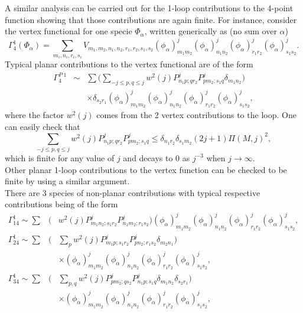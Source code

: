 \documentclass[a4paper,11pt,twoside]{article}
\numberwithin{equation}{section}
\theoremstyle{nonumberplain}
\newcounter{and}
\begin{document}
A similar analysis can be carried out for the 1-loop contributions to the 4-point function showing that those contributions are again finite. For instance, consider the vertex functional for one specie $\Phi_\alpha$, written generically as (no sum over $\alpha$)
\begin{equation}
\Gamma^1_4(\Phi_\alpha)=\sum_{m_i,n_i,r_i,s_i} V_{m_1,m_2,n_1,n_2,r_1,r_2,s_1,s_2}(\phi_\alpha)^j_{m_1m_2}(\phi_\alpha)^j_{n_1n_2}(\phi_\alpha)^j_{r_1r_2}(\phi_\alpha)^j_{s_1s_2}\label{vertex-functional}.
\end{equation}
Typical planar contributions to the vertex functional are of the form
\begin{eqnarray}
\Gamma^{P\ 1}_4&\sim&\sum\big(\sum_{-j\le p,q\le j}w^2(j)P^j_{n_1p;qr_2}P^j_{pm_2;s_1q}\delta_{m_1n_2}\big)\nonumber\\
&&\times\delta_{s_2r_1} (\phi_\alpha)^j_{m_1m_2}(\phi_\alpha)^j_{n_1n_2}(\phi_\alpha)^j_{r_1r_2}(\phi_\alpha)^j_{s_1s_2}\label{planar-4pt},
\end{eqnarray}
where the factor $w^2(j)$ comes from the 2 vertex contributions to the loop. One can easily check that
\begin{equation}
\sum_{-j\le p,q\le j}w^2(j)P^j_{n_1p;qr_2}P^j_{pm_2;s_1q}\le\delta_{n_1r_2}
\delta_{s_1m_2}(2j+1)\Pi(M,j)^2\label{bound-planar-4pt},
\end{equation}
which is finite for any value of $j$ and decays to $0$ as $j^{-3}$ when $j\to\infty$. \\
Other planar 1-loop contributions to the vertex function can be checked to be finite by using a similar argument.\\
There are 3 species of non-planar contributions with typical respective contributions being of the form
\begin{eqnarray}
\Gamma^1_{14}\sim\sum &\big(&w^2(j)P^j_{m_1n_2;s_1r_2}P^j_{n_1m_2;r_1s_2}\big)(\phi_\alpha)^j_{m_1m_2}(\phi_\alpha)^j_{n_1n_2}(\phi_\alpha)^j_{r_1r_2}(\phi_\alpha)^j_{s_1s_2}\label{gamma14},\\
\Gamma^1_{24}\sim\sum&\big(&\sum_pw^2(j)P^j_{m_1p;s_1r_2}P^j_{pn_2;r_1s_2}\delta_{m_2n_1}\big)\nonumber\\
&&\times(\phi_\alpha)^j_{m_1m_2}(\phi_\alpha)^j_{n_1n_2}(\phi_\alpha)^j_{r_1r_2}(\phi_\alpha)^j_{s_1s_2}\label{gamma24},\\
\Gamma^1_{34}\sim\sum&\big(&\sum_{p,q}w^2(j)P^j_{pm_2;qs_2}P^j_{n_1p;s_1q}
\delta_{m_1n_2}\delta_{s_2r_1} \big)\nonumber\\
&&\times(\phi_\alpha)^j_{m_1m_2}(\phi_\alpha)^j_{n_1n_2}(\phi_\alpha)^j_{r_1r_2}(\phi_\alpha)^j_{s_1s_2}\label{gamma34},
\end{eqnarray}
\end{document}

